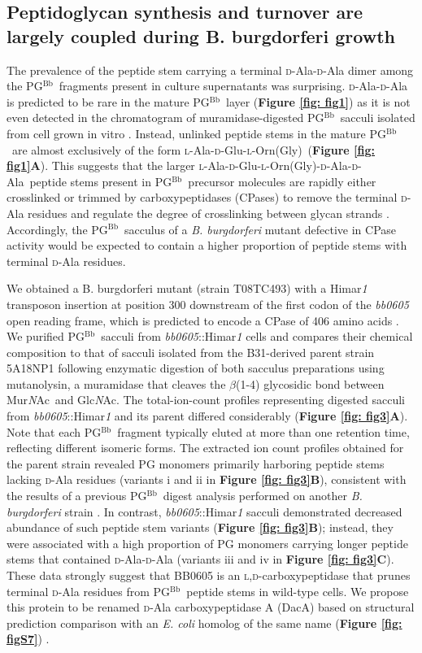 \documentclass[twoside, watermark]{zHenriquesLab-StyleBioRxiv}
\newcommand{\pgbb}{PG$^\text{Bb}$}
\newcommand{\AEOAAG}{\textsc{l}-Ala-\textsc{d}-Glu-\textsc{l}-Orn(Gly)-\textsc{d}-Ala-\textsc{d}-Ala}
\newcommand{\AEOG}{\textsc{l}-Ala-\textsc{d}-Glu-\textsc{l}-Orn(Gly)}
\newcommand{\NAM}{Mur\textit{N}Ac}
\newcommand{\NAG}{Glc\textit{N}Ac}
\newcommand{\scl}{\textsc{l}} %
\newcommand{\scd}{\textsc{d}} %
\begin{document}
\subsection*{Peptidoglycan synthesis and turnover are largely coupled during B. burgdorferi growth}
The prevalence of the peptide stem carrying a terminal \scd-Ala-\scd-Ala dimer among the \pgbb~fragments present in culture supernatants was surprising. \scd-Ala-\scd-Ala is predicted to be rare in the mature \pgbb~layer (\textbf{Figure \ref{fig: fig1}}) as it is not even detected in the chromatogram of muramidase-digested \pgbb~sacculi isolated from cell grown in vitro \cite{Jutras2019}. Instead, unlinked peptide stems in the mature \pgbb~are almost exclusively of the form \AEOG~(\textbf{Figure \ref{fig: fig1}A}). This suggests that the larger \AEOAAG~peptide stems present in \pgbb~precursor molecules are rapidly either crosslinked or trimmed by carboxypeptidases (CPases) to remove the terminal \scd-Ala residues and regulate the degree of crosslinking between glycan strands \cite{dePedro2015,Sauvage2008}. Accordingly, the \pgbb~sacculus of a \textit{B. burgdorferi} mutant defective in CPase activity would be expected to contain a higher proportion of peptide stems with terminal \scd-Ala residues.

\vspace{1mm}
We obtained a B. burgdorferi mutant (strain T08TC493) with a Himar\textit{1} transposon insertion at position 300 downstream of the first codon of the \textit{bb0605} open reading frame, which is predicted to encode a CPase of 406 amino acids \cite{Lin2012}. We purified \pgbb~sacculi from \textit{bb0605}::Himar\textit{1} cells and compares their chemical composition to that of sacculi isolated from the B31-derived parent strain 5A18NP1 following enzymatic digestion of both sacculus preparations using mutanolysin, a muramidase that cleaves the $\beta$(1-4) glycosidic bond between \NAM~and \NAG. The total-ion-count profiles representing digested sacculi from \textit{bb0605}::Himar\textit{1} and its parent differed considerably (\textbf{Figure \ref{fig: fig3}A}). Note that each \pgbb~fragment typically eluted at more than one retention time, reflecting different isomeric forms. The extracted ion count profiles obtained for the parent strain revealed PG monomers primarily harboring peptide stems lacking \scd-Ala residues (variants i and ii in \textbf{Figure \ref{fig: fig3}B}), consistent with the results of a previous \pgbb~digest analysis performed on another \textit{B. burgdorferi} strain \cite{Jutras2019}. In contrast, \textit{bb0605}::Himar\textit{1} sacculi demonstrated decreased abundance of such peptide stem variants (\textbf{Figure \ref{fig: fig3}B}); instead, they were associated with a high proportion of PG monomers carrying longer peptide stems that contained \scd-Ala-\scd-Ala (variants iii and iv in \textbf{Figure \ref{fig: fig3}C}). These data strongly suggest that BB0605 is an \scl,\scd-carboxypeptidase that prunes terminal \scd-Ala residues from \pgbb~peptide stems in wild-type cells. We propose this protein to be renamed \scd-Ala carboxypeptidase A (DacA) based on structural prediction comparison with an  \textit{E. coli} homolog of the same name (\textbf{Figure \ref{fig: figS7}}) \cite{Ghosh2003}. 
\end{document}
